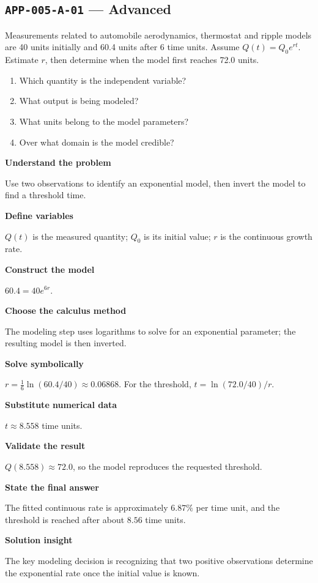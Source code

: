 \documentclass[11pt]{book}
\newcommand{\pid}[1]{\texttt{#1}}
\begin{document}
\subsection*{\pid{APP-005-A-01} — Advanced}
\begin{problembox}
Measurements related to automobile aerodynamics, thermostat and ripple models are 40 units initially and 60.4 units after 6 time units. Assume $Q(t)=Q_0e^{rt}$. Estimate $r$, then determine when the model first reaches 72.0 units.
\end{problembox}
\begin{promptbox}\begin{enumerate}
\item Which quantity is the independent variable?
\item What output is being modeled?
\item What units belong to the model parameters?
\item Over what domain is the model credible?
\end{enumerate}\end{promptbox}
\begin{solutionbox}
\textbf{Understand the problem}\par Use two observations to identify an exponential model, then invert the model to find a threshold time.\par\medskip
\textbf{Define variables}\par $Q(t)$ is the measured quantity; $Q_0$ is its initial value; $r$ is the continuous growth rate.\par\medskip
\textbf{Construct the model}\par $60.4=40e^{6r}$.\par\medskip
\textbf{Choose the calculus method}\par The modeling step uses logarithms to solve for an exponential parameter; the resulting model is then inverted.\par\medskip
\textbf{Solve symbolically}\par $r=\frac1{6}\ln(60.4/40)\approx 0.06868$. For the threshold, $t=\ln(72.0/40)/r$.\par\medskip
\textbf{Substitute numerical data}\par $t\approx 8.558$ time units.\par\medskip
\textbf{Validate the result}\par $Q(8.558)\approx 72.0$, so the model reproduces the requested threshold.\par\medskip
\textbf{State the final answer}\par The fitted continuous rate is approximately $6.87\%$ per time unit, and the threshold is reached after about $8.56$ time units.\par\medskip
\textbf{Solution insight}\par The key modeling decision is recognizing that two positive observations determine the exponential rate once the initial value is known.\par\medskip
\end{solutionbox}
\end{document}
